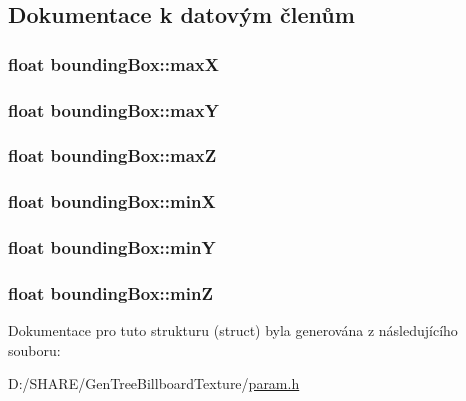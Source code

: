 \subsection{Dokumentace k datovým členům}
\hypertarget{structbounding_box_a735be77f73dd98bc8cdc31432d8d3b65}{
\subsubsection[{maxX}]{\setlength{\rightskip}{0pt plus 5cm}float {\bf boundingBox::maxX}}}
\label{structbounding_box_a735be77f73dd98bc8cdc31432d8d3b65}
\hypertarget{structbounding_box_a218bdb8041570cdb09ad6a224a4721e1}{
\subsubsection[{maxY}]{\setlength{\rightskip}{0pt plus 5cm}float {\bf boundingBox::maxY}}}
\label{structbounding_box_a218bdb8041570cdb09ad6a224a4721e1}
\hypertarget{structbounding_box_a7caf79fe373109821df28b3424732e72}{
\subsubsection[{maxZ}]{\setlength{\rightskip}{0pt plus 5cm}float {\bf boundingBox::maxZ}}}
\label{structbounding_box_a7caf79fe373109821df28b3424732e72}
\hypertarget{structbounding_box_abbf1c6056f0f4003a26fb161a6679964}{
\subsubsection[{minX}]{\setlength{\rightskip}{0pt plus 5cm}float {\bf boundingBox::minX}}}
\label{structbounding_box_abbf1c6056f0f4003a26fb161a6679964}
\hypertarget{structbounding_box_a527466555224b3129211fae45ef193fe}{
\subsubsection[{minY}]{\setlength{\rightskip}{0pt plus 5cm}float {\bf boundingBox::minY}}}
\label{structbounding_box_a527466555224b3129211fae45ef193fe}
\hypertarget{structbounding_box_aaa155089b0eabd353e23c8d686f875f6}{
\subsubsection[{minZ}]{\setlength{\rightskip}{0pt plus 5cm}float {\bf boundingBox::minZ}}}
\label{structbounding_box_aaa155089b0eabd353e23c8d686f875f6}


Dokumentace pro tuto strukturu (struct) byla generována z následujícího souboru:\begin{DoxyCompactItemize}
\item 
D:/SHARE/GenTreeBillboardTexture/\hyperlink{param_8h}{param.h}\end{DoxyCompactItemize}
